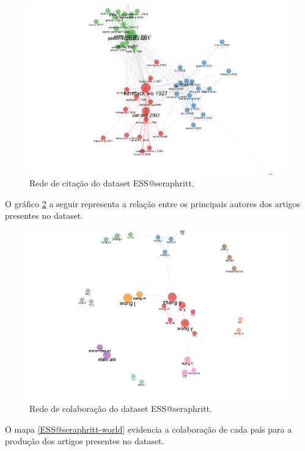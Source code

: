 \begin{figure}
    \centering
    \includegraphics[width=\textwidth]{exploratory-data-analysis/seraphritt/PesqBibliogr/Virus-Network/cocitation.png}
    \caption{Rede de citação do dataset ESS@seraphritt.}
    \label{ESS@seraphritt-cocite}
\end{figure}

O gráfico \ref{ESS@seraphritt-collab} a seguir representa a relação entre os principais autores dos artigos presentes no dataset.

\begin{figure}
    \centering
    \includegraphics[width=\textwidth]{exploratory-data-analysis/seraphritt/PesqBibliogr/Virus-Network/collaboration.png}
    \caption{Rede de colaboração do dataset ESS@seraphritt.}
    \label{ESS@seraphritt-collab}
\end{figure}

O mapa \ref{ESS@seraphritt-world} evidencia a colaboração de cada país para a produção dos artigos presentes no dataset.

